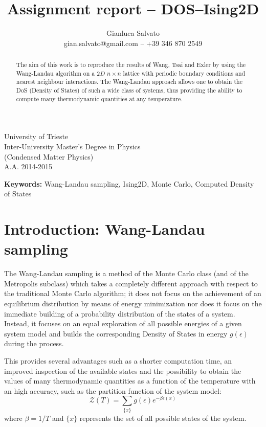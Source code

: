 \documentclass[11pt]{article}
\title{Assignment report -- DOS--Ising2D}
\author{Gianluca Salvato\\\small{gian.salvato@gmail.com -- +39 346 870 2549}}
\newenvironment{keywords}{\begin{adjustwidth}{5.2em}{5.2em}\footnotesize\textbf{Keywords:}}{\end{adjustwidth}}
\begin{document}
\VerbatimFootnotes
\DefineShortVerb{\|}

\maketitle
\begin{center}
	University of Trieste\\
	Inter-University Master’s Degree in Physics\\
	(Condensed Matter Physics)\\
	A.A. 2014-2015
\end{center}

\begin{abstract}
The aim of this work is to reproduce the results of Wang, Tsai and Exler \cite{bib:wang_landau} by using the Wang-Landau algorithm on a $2D$ $n\times n$ lattice with periodic boundary conditions and nearest neighbour interactions. The Wang-Landau approach allows one to obtain the DoS (Density of States) of such a wide class of systems, thus providing the ability to compute many thermodynamic quantities at any temperature.
\end{abstract}
\begin{keywords}
Wang-Landau sampling, Ising2D, Monte Carlo, Computed Density of States
\end{keywords}

\section{Introduction: Wang-Landau sampling}

The Wang-Landau sampling is a method of the Monte Carlo class (and of the Metropolis subclass) which takes a completely different approach with respect to the traditional Monte Carlo algorithm; it does not focus on the achievement of an equilibrium distribution by means of energy minimization nor does it focus on the immediate building of a probability distribution of the states of a system.
Instead, it focuses on an equal exploration of all possible energies of a given system model and builds the corresponding Density of States in energy $g(\epsilon)$ during the process.

This provides several advantages such as a shorter computation time, an improved inspection of the available states and the possibility to obtain the values of many thermodynamic quantities as a function of the temperature with an high accuracy, such as the partition function of the system model:
\[
	\mathcal Z(T) = \sum_{\{x\}}g(\epsilon)e^{-\beta \epsilon(x)}
\]
where $\beta = 1/T$ and $\{x\}$ represents the set of all possible states of the system.
\end{document}
